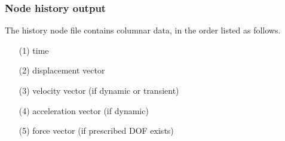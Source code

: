 \subsubsection{Node history output}
The history node file contains columnar data, in the order listed as 
follows. \\
\begin{itemize}
\item[(1)] time
\item[(2)] displacement vector
\item[(3)] velocity vector (if dynamic or transient)
\item[(4)] acceleration vector (if dynamic)
\item[(5)] force vector (if prescribed DOF exists)
\end{itemize}
